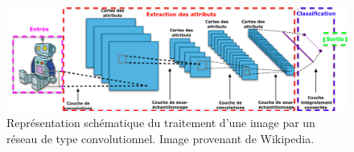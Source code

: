 \begin{figure}[h]
  \centering
  \includegraphics[width=14cm]{./Chapitre3/figures/cnn.png}
  \caption{Représentation schématique du traitement d'une image par un réseau de type convolutionnel. Image provenant de Wikipedia.}
  \label{fig:cnn}
\end{figure}
